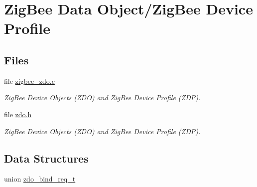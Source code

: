 \hypertarget{group__zdo}{}\section{Zig\+Bee Data Object/\+Zig\+Bee Device Profile}
\label{group__zdo}
\subsection*{Files}
\begin{DoxyCompactItemize}
\item 
file \hyperlink{zigbee__zdo_8c}{zigbee\+\_\+zdo.\+c}
\begin{DoxyCompactList}\small\item\em Zig\+Bee Device Objects (Z\+DO) and Zig\+Bee Device Profile (Z\+DP). \end{DoxyCompactList}\item 
file \hyperlink{zdo_8h}{zdo.\+h}
\begin{DoxyCompactList}\small\item\em Zig\+Bee Device Objects (Z\+DO) and Zig\+Bee Device Profile (Z\+DP). \end{DoxyCompactList}\end{DoxyCompactItemize}
\subsection*{Data Structures}
\begin{DoxyCompactItemize}
\item 
union \hyperlink{unionzdo__bind__req__t}{zdo\+\_\+bind\+\_\+req\+\_\+t}
\end{DoxyCompactItemize}

